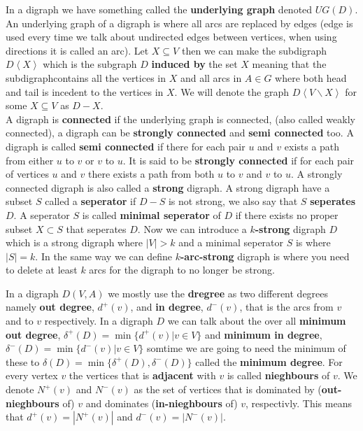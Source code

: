 In a digraph we have something called the \textbf{underlying graph} denoted $UG(D)$. 
An underlying graph of a digraph is where all arcs are replaced by edges (edge is used every time we talk about undirected edges between vertices, when using directions it is called an arc).
Let $X \subseteq V$ then we can make the subdigraph $D\left< X\right>$ which is the subgraph $D$ \textbf{induced by} the set $X$ meaning that the subdigraphcontains all the vertices in $X$ and all arcs in $A\in G$ where both head and tail is incedent to the vertices in $X$. 
We will denote the graph $D\left< V\backslash X\right>$ for some $X\subseteq V$ as $D-X$.\\
A digraph is \textbf{connected} if the underlying graph is connected, (also called weakly connected), a digraph can be \textbf{strongly connected} and \textbf{semi connected} too.
A digraph is called \textbf{semi connected} if there for each pair $u$ and $v$ exists a path from either $u$ to $v$ or $v$ to $u$.  
It is said to be \textbf{strongly connected} if for each pair of vertices $u$ and $v$ there exists a path from both $u$ to $v$ and $v$ to $u$. A strongly connected digraph is also called a \textbf{strong} digraph. 
A strong digraph have a subset $S$ called a \textbf{seperator} if $D-S$ is not strong, we also say that $S$ \textbf{seperates} $D$. 
A seperator $S$ is called \textbf{minimal seperator} of $D$ if there exists no proper subset $X\subset S$ that seperates $D$.
Now we can introduce a \textbf{$k$-strong} digraph $D$ which is a strong digraph where $|V|> k$ and a minimal seperator $S$ is  where $|S|= k$.
In the same way we can define $k$\textbf{-arc-strong} digraph is where you need to delete at least $k$ arcs for the digraph to no longer be strong. 

In a digraph $D(V,A)$ we mostly use the \textbf{dregree} as two different degrees namely \textbf{out degree}, $d^+(v)$, and \textbf{in degree}, $d^-(v)$, that is the arcs from $v$ and to $v$ respectively. 
In a digraph $D$ we can talk about the over all \textbf{minimum out degree}, $\delta ^+(D)=\min\lbrace d^+(v)|v\in V\rbrace$ and \textbf{minimum in degree}, $\delta ^-(D)=\min\lbrace d^-(v)|v\in V\rbrace$
somtime we are going to need the minimum of these to $\delta(D)=\min \lbrace\delta ^+(D),\delta ^-(D) \rbrace$ called the \textbf{minimum degree}.
For every vertex $v$ the vertices that is \textbf{adjacent} with $v$ is called \textbf{nieghbours} of $v$.
We denote $N^+(v)$ and $N^-(v)$ as the set of vertices that is dominated by (\textbf{out-nieghbours} of) $v$ and dominates (\textbf{in-nieghbours} of) $v$, respectivly. 
This means that $d^+(v)=|N^+(v)|$ and $d^-(v)=|N^-(v)|$.\\


